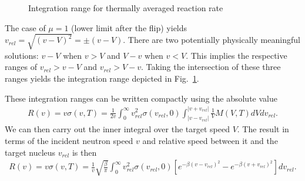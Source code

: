 \begin{figure}[tb!]
\begin{center}
\begin{center}
\end{center}
\caption{Integration range for thermally averaged reaction rate}
\label{Fig:libraryGeneration_thermalAveragingIntegrationRange}
\end{center}
\end{figure}

The case of $\mu = 1$ (lower limit after the flip) yields $v_{rel} = \sqrt{(v - V)^2} = \pm ( v - V )$. There are two potentially physically meaningful solutions: $v - V$ when $v > V$ and $V - v$ when $v < V$. This implies the respective ranges of $v_{rel} > v - V$ and $v_{rel} > V - v$. Taking the intersection of these three ranges yields the integration range depicted in Fig.~\ref{Fig:libraryGeneration_thermalAveragingIntegrationRange}.

These integration ranges can be written compactly using the absolute value
\begin{align}
  R(v) = v \sigma(v,T) = \frac{1}{2 v} \int_0^\infty v_{rel}^2 \sigma(v_{rel},0) \int_{|v-v_{rel}|}^{|v+v_{rel}|} \frac{1}{V} M(V,T) dV dv_{rel}  .
\end{align}
We can then carry out the inner integral over the target speed $V$. The result in terms of the incident neutron speed $v$ and relative speed between it and the target nucleus $v_{rel}$ is then
\begin{align}
  R(v) = v \sigma(v,T) = \frac{1}{v} \sqrt{ \frac{\beta}{\pi} } \int_0^\infty v_{rel}^2 \sigma(v_{rel},0) \left[ e^{-\beta ( v - v_{rel} )^2} -  e^{-\beta ( v + v_{rel} )^2} \right] dv_{rel}  .
\end{align}


